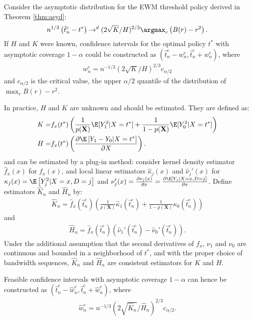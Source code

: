 {Consider the asymptotic distribution for the EWM threshold policy derived in Theorem \ref{thm:asyd}:
\begin{gather}
    n^{1 / 3}\left(\hat{t}^e_n-t^*\right) \rightarrow^d (2\sqrt{K}/H)^{2/3}\argmax_r \left(B(r) - r^2 \right).
\end{gather}
If $H$ and $K$ were known, confidence intervals for the optimal policy $t^*$ with asymptotic coverage $1- \alpha$ could be constructed as $(\hat{t}^e_n - w^e_n, \hat{t}^e_n + w^e_n)$, where
\begin{gather}
    w^e_n = n^{-1/3} (2\sqrt{K}/H)^{2/3}c_{\alpha/2}
\end{gather}
and $c_{\alpha/2}$ is the critical value, the upper $\alpha/2$ quantile of the distribution of $\max_{r} B(r) - r^2$.

In practice, $H$ and $K$ are unknown and should be estimated. They are defined as:
\begin{align*}
    K
    =& f_x(t^*) \left(\frac{1}{p(\textbf{X})} \E[Y_1^2|X = t^*] + \frac{1}{1-p(\textbf{X})} \E[Y_0^2|X = t^*] \right) \\
    H =&  f_x(t^*) \left(\frac{\partial \E\left[Y_1 - Y_0 | X = t^* \right]}{\partial X} \right).
\end{align*}
and can be estimated by a plug-in method: consider kernel density estimator $\hat f_x(x)$ for $f_x(x)$, and local linear estimators $\hat \kappa_j(x)$ and $\hat \nu_j'(x)$ for $\kappa_j(x) = \E\left[Y_j^2 | X =x, D=j \right]$ and $\nu_j'(x) = \frac{\partial \nu_j(x)}{\partial x} = \frac{\partial \E\left[Y_j | X =x, D=j \right]}{\partial x}$. Define estimators $\hat{K}_n$ and $\hat H_n$ by:
\begin{gather} \label{eq:K}
    \hat{K}_n = \hat f_x(\hat{t}^e_n) \left( \frac{1}{p(\textbf{X})} \hat \kappa_1(\hat{t}^e_n) + \frac{1}{1-p(\textbf{X})} \hat \kappa_0(\hat{t}^e_n) \right)
\end{gather}
and
\begin{gather} \label{eq:H}
    \hat H_n = \hat f_x(\hat{t}^e_n)(\hat \nu_1'(\hat{t}^e_n) - \hat \nu_0'(\hat{t}^e_n)).
\end{gather}
Under the additional assumption that the second derivatives of $f_x$, $\nu_1$ and $\nu_0$ are continuous and bounded in a neighborhood of $t^*$, and with the proper choice of bandwidth sequences, $\hat{K}_n$ and $\hat H_n$ are consistent estimators for $K$ and $H$.

Feasible confidence intervals with asymptotic coverage $1- \alpha$ can hence be constructed as $(\hat{t}^e_n - \hat{w}^e_n, \hat{t}^e_n + \hat{w}^e_n) $, where
\begin{gather}
    \hat{w}^e_n = n^{-1/3} (2\sqrt{\hat{K}_n}/\hat{H}_n)^{2/3}c_{\alpha/2}.
\end{gather}

}
